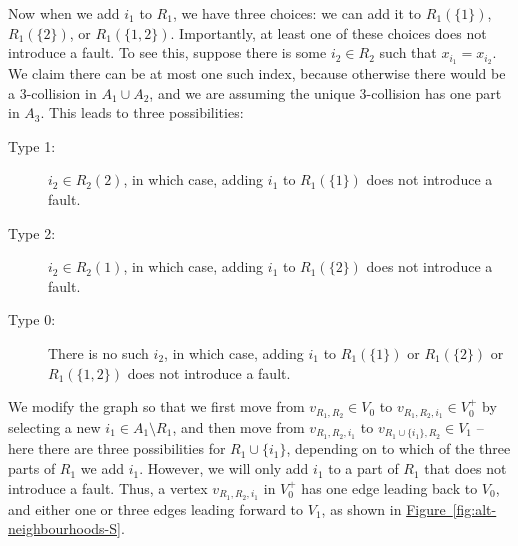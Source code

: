\documentclass{theoretics}
\newcommand{\fig}[1]{\hyperref[fig:#1]{Figure~\ref*{fig:#1}}}
\renewcommand{\>}{\rangle}
\newcommand{\<}{\langle}
\renewcommand{\(}{\left(}
\renewcommand{\)}{\right)}
\begin{document}
Now when we add $i_1$ to $R_1$, we have three choices: we can add it to $R_1(\{1\})$, $R_1(\{2\})$, or $R_1(\{1,2\})$. Importantly, at least one of these choices does not introduce a fault. To see this, suppose there is some $i_2\in R_2$ such that $x_{i_1}=x_{i_2}$. We claim there can be at most one such index, because otherwise there would be a 3-collision in $A_1\cup A_2$, and we are assuming the unique 3-collision has one part in $A_3$. This leads to three possibilities:
\begin{description}
\item[Type 1:] $i_2\in R_2(2)$, in which case, adding $i_1$ to $R_1(\{1\})$ does not introduce a fault.
\item[Type 2:] $i_2\in R_2(1)$, in which case, adding $i_1$ to $R_1(\{2\})$ does not introduce a fault.
\item[Type 0:] There is no such $i_2$, in which case, adding $i_1$ to $R_1(\{1\})$ or $R_1(\{2\})$ or $R_1(\{1,2\})$ does not introduce a fault.
\end{description}
We modify the graph so that we first move from $v_{R_1,R_2}\in V_0$ to $v_{R_1,R_2,i_1}\in V_0^+$ by selecting a new $i_1\in A_1\setminus R_1$, and then move from $v_{R_1,R_2,i_1}$ to $v_{R_1\cup\{i_1\},R_2}\in V_1$ -- here there are three possibilities for $R_1\cup\{i_1\}$, depending on to which of the three parts of $R_1$ we add $i_1$. However, we will only add $i_1$ to a part of $R_1$ that does not introduce a fault. Thus, a vertex $v_{R_1,R_2,i_1}$ in $V_0^+$ has one edge leading back to $V_0$, and either one or three edges leading forward to $V_1$, as shown in \fig{alt-neighbourhoods-S}.
\end{document}
